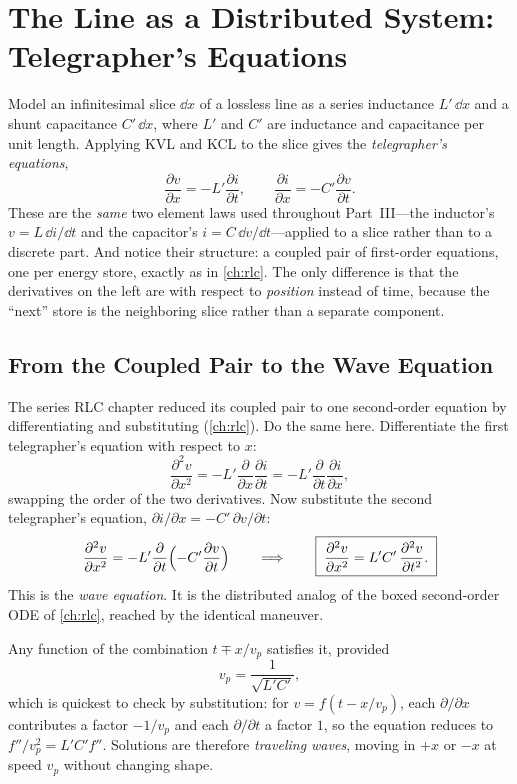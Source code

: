\section{The Line as a Distributed System: Telegrapher's Equations}
Model an infinitesimal slice \(\dd x\) of a lossless line as a series inductance
\(L'\,\dd x\) and a shunt capacitance \(C'\,\dd x\), where \(L'\) and \(C'\) are
inductance and capacitance per unit length. Applying KVL and KCL to the slice
gives the \emph{telegrapher's equations},
\[
\frac{\partial v}{\partial x}=-L'\frac{\partial i}{\partial t},
\qquad
\frac{\partial i}{\partial x}=-C'\frac{\partial v}{\partial t}.
\]
These are the \emph{same} two element laws used throughout Part~III---the inductor's
\(v=L\,\dd i/\dd t\) and the capacitor's \(i=C\,\dd v/\dd t\)---applied to a slice
rather than to a discrete part. And notice their structure: a coupled pair of
first-order equations, one per energy store, exactly as in \cref{ch:rlc}. The only
difference is that the derivatives on the left are with respect to \emph{position}
instead of time, because the ``next'' store is the neighboring slice rather than a
separate component.

\subsection{From the Coupled Pair to the Wave Equation}
The series RLC chapter reduced its coupled pair to one second-order equation by
differentiating and substituting (\cref{ch:rlc}). Do the same here. Differentiate
the first telegrapher's equation with respect to \(x\):
\[
\frac{\partial^2 v}{\partial x^2}
=-L'\frac{\partial}{\partial x}\frac{\partial i}{\partial t}
=-L'\frac{\partial}{\partial t}\frac{\partial i}{\partial x},
\]
swapping the order of the two derivatives. Now substitute the second telegrapher's
equation, \(\partial i/\partial x=-C'\,\partial v/\partial t\):
\[
\frac{\partial^2 v}{\partial x^2}
=-L'\frac{\partial}{\partial t}\Bigl(-C'\frac{\partial v}{\partial t}\Bigr)
\qquad\Longrightarrow\qquad
\boxed{\;\frac{\partial^2 v}{\partial x^2}=L'C'\,\frac{\partial^2 v}{\partial t^2}.\;}
\]
This is the \emph{wave equation}. It is the distributed analog of the boxed
second-order ODE of \cref{ch:rlc}, reached by the identical maneuver.

Any function of the combination \(t\mp x/v_p\) satisfies it, provided
\[
v_p=\frac{1}{\sqrt{L'C'}},
\]
which is quickest to check by substitution: for \(v=f(t-x/v_p)\), each
\(\partial/\partial x\) contributes a factor \(-1/v_p\) and each
\(\partial/\partial t\) a factor \(1\), so the equation reduces to
\(f''/v_p^2=L'C'f''\). Solutions are therefore \emph{traveling waves}, moving in
\(+x\) or \(-x\) at speed \(v_p\) without changing shape.


